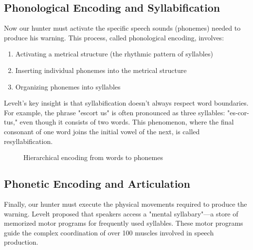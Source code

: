 \documentclass[12pt,a4paper]{article}
\begin{document}
\subsection{Phonological Encoding and Syllabification}

Now our hunter must activate the specific speech sounds (phonemes) needed to produce his warning. This process, called phonological encoding, involves:

\begin{enumerate}
\item Activating a metrical structure (the rhythmic pattern of syllables)
\item Inserting individual phonemes into the metrical structure
\item Organizing phonemes into syllables
\end{enumerate}

Levelt's key insight is that syllabification doesn't always respect word boundaries. For example, the phrase "escort us" is often pronounced as three syllables: "es-cor-tus," even though it consists of two words. This phenomenon, where the final consonant of one word joins the initial vowel of the next, is called resyllabification.

\begin{figure}[h]
\centering
{}
\caption{Hierarchical encoding from words to phonemes}
\label{fig:phono_encoding}
\end{figure}

\subsection{Phonetic Encoding and Articulation}

Finally, our hunter must execute the physical movements required to produce the warning. Levelt proposed that speakers access a "mental syllabary"—a store of memorized motor programs for frequently used syllables. These motor programs guide the complex coordination of over 100 muscles involved in speech production.
\end{document}
